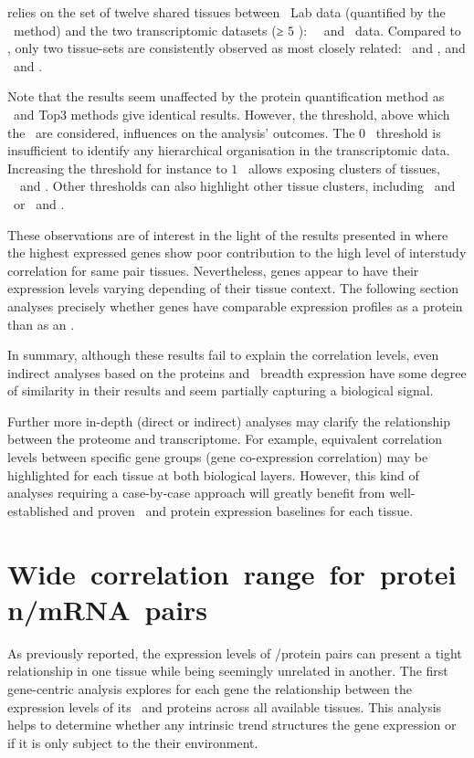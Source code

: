  relies on the set of twelve shared tissues between
\pandey\ Lab data (quantified by the \PPKM\ method)
and the two transcriptomic datasets (≥ $5$ \FPKM): \uhlen\ \etal\ and \gtex\ data.
Compared to ,
only two tissue-sets are consistently observed
as most closely related: \Testis\ and \Ovary, and \Liver\ and \Kidney.

Note that the results seem unaffected by the protein quantification method
as \PPKM\ and Top3 methods give identical results.
However, the threshold,
above which the \mRNAs\ are considered,
influences on the analysis' outcomes.
The $0$ \FPKM\ threshold is insufficient
to identify any hierarchical organisation in the transcriptomic data.
Increasing the threshold for instance to $1$ \FPKM\
allows exposing clusters of tissues, \eg\ \Liver\ and \Kidney{}.
Other thresholds can also highlight other tissue clusters,
including \Rectum\ and \hColon\ or \Pancreas\ and \Gall{}.

These observations are of interest in the light of the results
presented in 
where the highest expressed genes show poor contribution
to the high level of interstudy correlation for same pair tissues.
Nevertheless,
genes appear to have their expression levels varying
depending of their tissue context.
The following section  analyses precisely
whether genes have comparable expression profiles
as a protein than as an \mRNA{}.\mybr\

In summary, although these results fail to explain the correlation levels,
even indirect analyses based on the proteins and \mRNAs\ breadth expression
have some degree of similarity in their results
and seem partially capturing a biological signal.\mybr\

Further more in-depth (direct or indirect)  analyses
may clarify the relationship between the proteome and transcriptome.
For example, equivalent correlation levels between specific gene groups
(gene co-expression correlation) may be highlighted
for each tissue at both biological layers.
However, this kind of analyses requiring a case-by-case approach
will greatly benefit from
well-established and proven \mRNA\ and protein expression baselines
for each tissue.


\section{Wide~correlation~range~for~protein/mRNA~pairs}\label{sec:GenesCorRNAProt}
As previously reported, %
the expression levels of \mRNA/protein pairs can present
a tight relationship in one tissue
while being seemingly unrelated in another.
The first gene-centric analysis explores for each gene
the relationship between the expression levels of its \mRNAs\ and proteins
across all available tissues.
This analysis helps to determine
whether any intrinsic trend structures the gene expression
or if it is only subject to the their environment.

